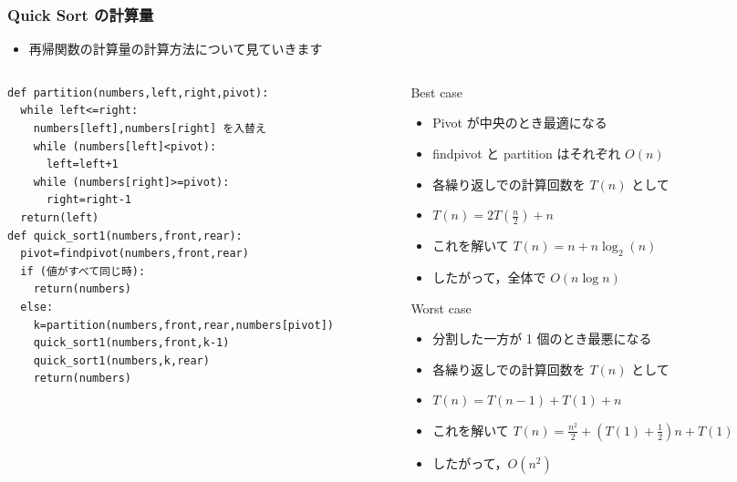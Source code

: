 \begin{frame}
\frametitle{Quick Sort の計算量}
  \begin{itemize}
\item 再帰関数の計算量の計算方法について見ていきます
  \end{itemize}
\vspace{-5mm}
  \begin{columns}[t,onlytextwidth]
    \begin{column}{0.45\linewidth}
      \begin{lstlisting}[caption={擬似コード},label=insertion_sort]
def partition(numbers,left,right,pivot):
  while left<=right:
    numbers[left],numbers[right] を入替え
    while (numbers[left]<pivot):
      left=left+1
    while (numbers[right]>=pivot):
      right=right-1
  return(left)
def quick_sort1(numbers,front,rear):
  pivot=findpivot(numbers,front,rear)
  if (値がすべて同じ時):
    return(numbers)
  else:
    k=partition(numbers,front,rear,numbers[pivot])
    quick_sort1(numbers,front,k-1)
    quick_sort1(numbers,k,rear)
    return(numbers)
      \end{lstlisting}
    \end{column}
    \begin{column}{0.5\linewidth}
      \begin{itembox}[l]{Best case}
        \begin{itemize}
\tiny
\item Pivot が中央のとき最適になる
\item findpivot と partition はそれぞれ $O(n)$
\item 各繰り返しでの計算回数を \(T(n)\) として
\item \(T(n)=2T(\frac{n}{2})+n\)
\item これを解いて \(T(n)=n+n\log_2(n)\)
\item したがって，全体で \(O(n\log n)\) 
        \end{itemize}
      \end{itembox}
      \begin{itembox}[l]{Worst case}
        \begin{itemize}
\tiny
\item 分割した一方が 1 個のとき最悪になる
\item 各繰り返しでの計算回数を \(T(n)\) として
\item \(T(n)=T(n-1)+T(1)+n\)
\item これを解いて \(T(n)=\frac{n^2}{2}+(T(1)+\frac{1}{2})n+T(1)\)
\item したがって，\(O(n^2)\)
        \end{itemize}
      \end{itembox}
    \end{column}
  \end{columns}
\end{frame}
